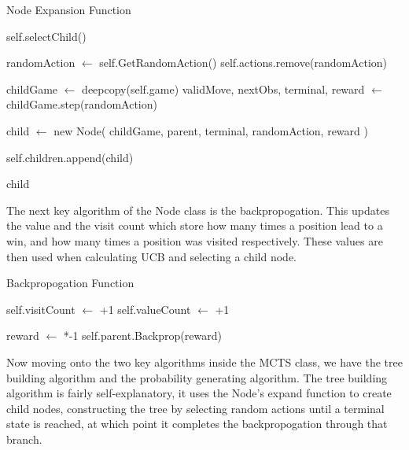 \documentclass{article}
\begin{document}
    \pagebreak
    \vspace*{7mm}
    \begin{algorithm} 
        \caption{Node Expansion Function}
        \begin{algorithmic}
                \State \Return self.selectChild()
            \EndIf
            
            \State randomAction $\gets$ self.GetRandomAction()
            \State self.actions.remove(randomAction)
            
            \State childGame $\gets$ deepcopy(self.game)
            \State validMove, nextObs, terminal, reward $\gets$ childGame.step(randomAction)

            \State child $\gets$ new Node(
                childGame,
                parent,
                terminal,
                randomAction,
                reward
            )

            \State self.children.append(child)

            \Return child
        \EndFunction
        \end{algorithmic}
    \end{algorithm}

    The next key algorithm of the Node class is the backpropogation. This updates the value
    and the visit count which store how many times a position lead to a win, and how many times
    a position was visited respectively. These values are then used when calculating UCB and selecting
    a child node.

    \begin{algorithm} 
        \caption{Backpropogation Function}
        \begin{algorithmic}
            \State self.visitCount $\gets$ +1
            \State self.valueCount $\gets$ +1

                    \State reward $\gets$ *-1
                \EndIf
                \State self.parent.Backprop(reward)
            \EndIf
        \EndFunction
        \end{algorithmic}
    \end{algorithm}

    Now moving onto the two key algorithms inside the MCTS class, we have the tree building algorithm and
    the probability generating algorithm. The tree building algorithm is fairly self-explanatory, it uses the
    Node's expand function to create child nodes, constructing the tree by selecting random actions until a terminal
    state is reached, at which point it completes the backpropogation through that branch.
    
\end{document}
